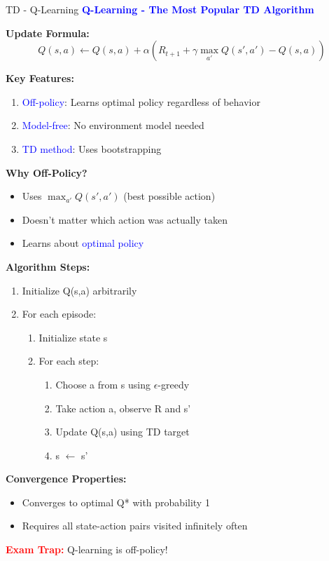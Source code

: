 \documentclass[8pt]{beamer}
\begin{document}
\begin{frame}{TD - Q-Learning}
\fontsize{6.5}{7.5}\selectfont
\textcolor{blue}{\textbf{Q-Learning - The Most Popular TD Algorithm}}

\textbf{Update Formula:}
\[
Q(s,a) \leftarrow Q(s,a) + \alpha(R_{t+1} + \gamma \max_{a'} Q(s',a') - Q(s,a))
\]

\textbf{Key Features:}
\begin{enumerate}
\item \textcolor{blue}{Off-policy}: Learns optimal policy regardless of behavior
\item \textcolor{blue}{Model-free}: No environment model needed
\item \textcolor{blue}{TD method}: Uses bootstrapping
\end{enumerate}

\textbf{Why Off-Policy?}
\begin{itemize}
\item Uses $\max_{a'} Q(s',a')$ (best possible action)
\item Doesn't matter which action was actually taken
\item Learns about \textcolor{blue}{optimal policy}
\end{itemize}

\textbf{Algorithm Steps:}
\begin{enumerate}
\item Initialize Q(s,a) arbitrarily
\item For each episode:
\begin{enumerate}
\item Initialize state s
\item For each step:
\begin{enumerate}
\item Choose a from s using $\epsilon$-greedy
\item Take action a, observe R and s'
\item Update Q(s,a) using TD target
\item s $\leftarrow$ s'
\end{enumerate}
\end{enumerate}
\end{enumerate}

\textbf{Convergence Properties:}
\begin{itemize}
\item Converges to optimal Q* with probability 1
\item Requires all state-action pairs visited infinitely often
\end{itemize}

\textcolor{red}{\textbf{Exam Trap:}} Q-learning is off-policy!
\end{frame}
\end{document}
